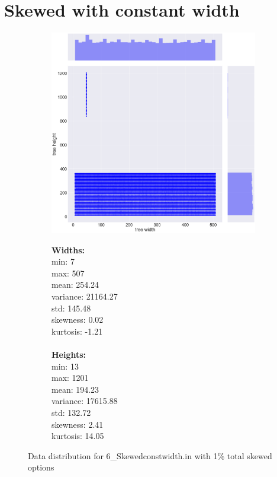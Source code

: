 \section{Skewed with constant width}
\begin{figure}[H]
\centering
\begin{subfigure}{.8\textwidth}
	\includegraphics[width=.9\textwidth]{img/6_SKEWEDCONSTWIDTH_plot.png}
\end{subfigure}%
\begin{subfigure}{.2\textwidth}
  \centering
  \begin{minipage}{1\textwidth}
\textbf{Widths:}
\\
min: 7
\\
max: 507
\\
mean: 254.24
\\
variance: 21164.27
\\
std: 145.48
\\
skewness: 0.02
\\
kurtosis: -1.21
\\\\
\textbf{Heights:}
\\
min: 13
\\
max: 1201
\\
mean: 194.23
\\
variance: 17615.88
\\
std: 132.72
\\
skewness: 2.41
\\
kurtosis: 14.05
  \end{minipage}
\end{subfigure}
\caption{Data distribution for 6\_Skewedconstwidth.in with 1\% total skewed options}
\label{appendix:data:skewedconstwidth}
\end{figure}